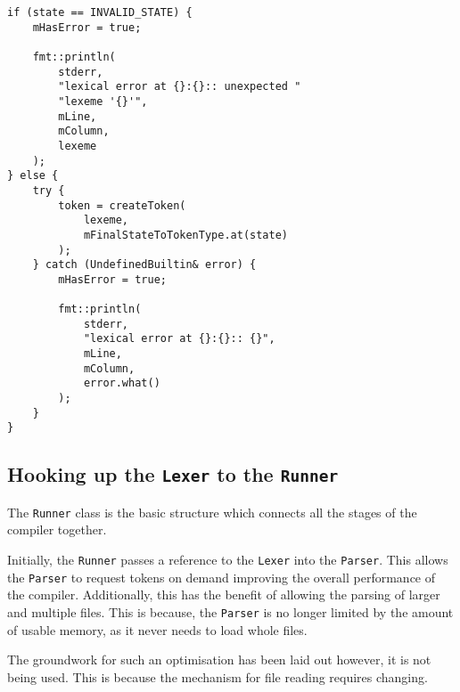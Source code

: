 \begin{lstlisting}[caption={Error handling mechanism in the
\texttt{nextToken()} \texttt{Lexer} method (lexer/Lexer.cpp).},
label=lst:lexererrors]
if (state == INVALID_STATE) {
    mHasError = true;

    fmt::println(
        stderr,
        "lexical error at {}:{}:: unexpected "
        "lexeme '{}'",
        mLine,
        mColumn,
        lexeme
    );
} else {
    try {
        token = createToken(
            lexeme,
            mFinalStateToTokenType.at(state)
        );
    } catch (UndefinedBuiltin& error) {
        mHasError = true;

        fmt::println(
            stderr,
            "lexical error at {}:{}:: {}",
            mLine,
            mColumn,
            error.what()
        );
    }
}
\end{lstlisting}

\subsection{Hooking up the \texttt{Lexer} to the
\texttt{Runner}}\label{sss:runnerlexer}

The \texttt{Runner} class is the basic structure which connects
all the stages of the compiler together.



Initially, the \texttt{Runner} passes a reference to the
\texttt{Lexer} into the \texttt{Parser}. This allows the
\texttt{Parser} to request tokens on demand improving the
overall performance of the compiler. Additionally, this has the
benefit of allowing the parsing of larger and multiple files.
This is because, the \texttt{Parser} is no longer limited by the
amount of usable memory, as it never needs to load whole files.

\begin{todo}
The groundwork for such an optimisation has been laid out
however, it is not being used. This is because the mechanism for
file reading requires changing.
\end{todo}
